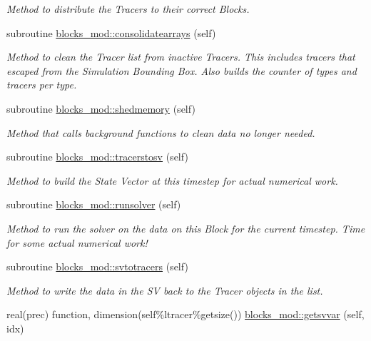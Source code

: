\begin{DoxyCompactItemize}
\begin{DoxyCompactList}\small\item\em Method to distribute the Tracers to their correct Blocks. \end{DoxyCompactList}\item 
subroutine \mbox{\hyperlink{namespaceblocks__mod_a25ff530b5125e4cee5b1f474b2491883}{blocks\+\_\+mod\+::consolidatearrays}} (self)
\begin{DoxyCompactList}\small\item\em Method to clean the Tracer list from inactive Tracers. This includes tracers that escaped from the Simulation Bounding Box. Also builds the counter of types and tracers per type. \end{DoxyCompactList}\item 
subroutine \mbox{\hyperlink{namespaceblocks__mod_a04a9fab577b0d1fb6cabefcde2b2180d}{blocks\+\_\+mod\+::shedmemory}} (self)
\begin{DoxyCompactList}\small\item\em Method that calls background functions to clean data no longer needed. \end{DoxyCompactList}\item 
subroutine \mbox{\hyperlink{namespaceblocks__mod_aa9c438503e619aa4352081ff46b15430}{blocks\+\_\+mod\+::tracerstosv}} (self)
\begin{DoxyCompactList}\small\item\em Method to build the State Vector at this timestep for actual numerical work. \end{DoxyCompactList}\item 
subroutine \mbox{\hyperlink{namespaceblocks__mod_a3245bdadbec6bb123c517921d1503b48}{blocks\+\_\+mod\+::runsolver}} (self)
\begin{DoxyCompactList}\small\item\em Method to run the solver on the data on this Block for the current timestep. Time for some actual numerical work! \end{DoxyCompactList}\item 
subroutine \mbox{\hyperlink{namespaceblocks__mod_a306a753acc9b8bb9107ebda481162180}{blocks\+\_\+mod\+::svtotracers}} (self)
\begin{DoxyCompactList}\small\item\em Method to write the data in the SV back to the Tracer objects in the list. \end{DoxyCompactList}\item 
real(prec) function, dimension(self\%ltracer\%getsize()) \mbox{\hyperlink{namespaceblocks__mod_a569c8a4a94791d4c0c24697b351ca8f2}{blocks\+\_\+mod\+::getsvvar}} (self, idx)

\end{DoxyCompactItemize}
